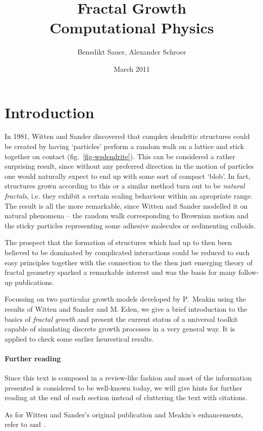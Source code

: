 \documentclass[twocolumn,10pt]{scrartcl}
\begin{document}
    \title{Fractal Growth \\ {\small Computational Physics}}
    \author{\small Benedikt Sauer, Alexander Schroer}
    \date{\small March 2011}

    \maketitle
 
    \section{Introduction}
        In 1981, Witten and Sander discovered that complex dendritic structures could be created by having
        `particles' perform a random walk on a lattice and stick together on contact (fig.~\ref{fig-wsdendrite}).
        This can be considered a rather surprising result, since without any preferred direction in the motion of
        particles one would naturally expect to end up with some sort of compact `blob'. In fact, structures grown
        according to this or a similar method turn out to be \emph{natural fractals}, i.e. they exhibit a certain 
        scaling behaviour within an apropriate range. The result is all the more remarkable, since Witten and Sander
        modelled it on natural phenomena -- the random walk corresponding to Brownian motion and the sticky particles
        representing some adhesive molecules or sedimenting colloids.

        The prospect that the formation of structures which had up to then been believed to be dominated by complicated
        interactions could be reduced to such easy principles together with the connection to the then just emerging
        theory of fractal geometry sparked a remarkable interest and was the basis for many follow-up publications.

        Focussing on two particular growth models developed by P.~Meakin using the results of Witten and Sander and
        M. Eden, we give a brief introduction to the basics of \emph{fractal growth}
        and present the current status of a universal toolkit capable of simulating discrete growth processes in a very
        general way. It is applied to check some earlier heurestical results.

        {\small
            \paragraph{Further reading}
                Since this text is composed in a review-like fashion and most of the information presented is
                considered to be well-known today, we will give hints for further reading at the end of each
                section instead of cluttering the text with citations.

                As for Witten and Sander's original publication and Meakin's enhancements, refer to
                \cite{src-wittensander} and \cite{src-meakin1}.
        }
\end{document}
